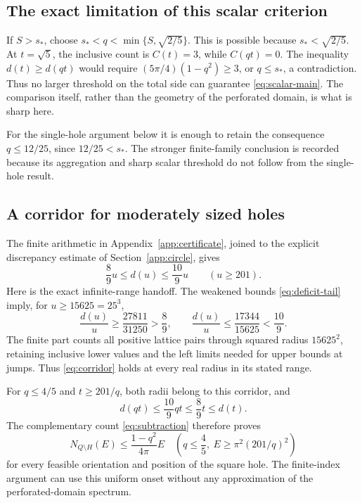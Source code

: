 \documentclass[11pt,reqno]{amsart}
\numberwithin{equation}{section}
\newcommand{\sstar}{s_*}
\begin{document}
\subsection*{The exact limitation of this scalar criterion}

If $S>\sstar$, choose
$\sstar<q<\min\{S,\sqrt{2/5}\}$. This is possible because
$\sstar<\sqrt{2/5}$. At $t=\sqrt5$, the inclusive count is
$C(t)=3$, while $C(qt)=0$. The inequality
$d(t)\ge d(qt)$ would require
$(5\pi/4)(1-q^2)\ge3$, or $q\le\sstar$, a contradiction.
Thus no larger threshold on the total side can guarantee
\eqref{eq:scalar-main}. The comparison itself, rather than the
geometry of the perforated domain, is what is sharp here.

For the single-hole argument below it is enough to retain the
consequence $q\le12/25$, since $12/25<s_*$. The stronger
finite-family conclusion is recorded because its aggregation and
sharp scalar threshold do not follow from the single-hole result.

\subsection*{A corridor for moderately sized holes}\label{sec:corridor}

The finite arithmetic in Appendix~\ref{app:certificate}, joined to
the explicit discrepancy estimate of Section~\ref{app:circle}, gives
\begin{equation}\label{eq:corridor}
 \frac89u\le d(u)\le\frac{10}{9}u\qquad(u\ge201).
\end{equation}
Here is the exact infinite-range handoff. The weakened bounds
\eqref{eq:deficit-tail} imply, for $u\ge15625=25^3$,
\[
 \frac{d(u)}u\ge\frac{27811}{31250}>\frac89,
 \qquad
 \frac{d(u)}u\le\frac{17344}{15625}<\frac{10}{9}.
\]
The finite part counts all positive lattice pairs through squared
radius $15625^2$, retaining inclusive lower values and the left
limits needed for upper bounds at jumps. Thus \eqref{eq:corridor}
holds at every real radius in its stated range.

For $q\le4/5$ and $t\ge201/q$, both radii belong to this corridor,
and
\[
 d(qt)\le\frac{10}{9}qt\le\frac89t\le d(t).
\]
The complementary count \eqref{eq:subtraction} therefore proves
\begin{equation}\label{eq:wide-tail}
 N_{Q\setminus H}(E)\le\frac{1-q^2}{4\pi}E
 \quad\left(q\le\frac45,\ E\ge\pi^2(201/q)^2\right)
\end{equation}
for every feasible orientation and position of the square hole.
The finite-index argument can use this uniform onset without any
approximation of the perforated-domain spectrum.
\end{document}
